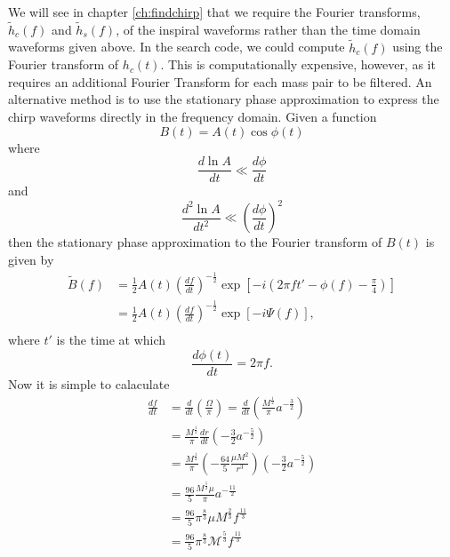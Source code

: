 We will see in chapter \ref{ch:findchirp} that we require the Fourier
transforms, $\tilde{h}_c(f)$ and $\tilde{h}_s(f)$, of the inspiral waveforms
rather than the time domain waveforms given above. In the search code, we
could compute $\tilde{h}_c(f)$ using the Fourier transform of $h_c(t)$.
This is computationally expensive, however, as it requires an additional
Fourier Transform for each mass pair to be filtered. An alternative 
method is to use the stationary phase approximation\cite{Mathews:1992} to
express the chirp waveforms directly in the frequency
domain\cite{WillWiseman:1996,Cutler:1994}. Given a function
\begin{equation}
B(t) = A(t) \cos \phi(t)
\end{equation}
where
\begin{equation}
\frac{d\ln A}{dt} \ll \frac{d\phi}{dt}
\end{equation}
and
\begin{equation}
\frac{d^2\ln A}{dt^2} \ll \left(\frac{d\phi}{dt}\right)^2
\end{equation}
then the stationary phase approximation to the Fourier transform of $B(t)$ is
given by
\begin{equation}
\begin{split}
\tilde{B}(f) &= \frac{1}{2} A(t) \left(\frac{df}{dt}\right)^{-\frac{1}{2}}
\exp\left[ -i \left(2\pi f t' - \phi(f) - \frac{\pi}{4} \right)\right] \\
&= \frac{1}{2} A(t) \left(\frac{df}{dt}\right)^{-\frac{1}{2}}
\exp\left[ -i \Psi(f) \right], \\
\end{split}
\label{eq:spexpression}
\end{equation}
where $t'$ is the time at which
\begin{equation}
\frac{d\phi(t)}{dt} = 2\pi f.
\end{equation}
Now it is simple to calaculate
\begin{align}
\label{eq:spdfdt}
\frac{df}{dt} 
     &= \frac{d}{dt} \left(\frac{\Omega}{\pi}\right) 
      = \frac{d}{dt} \left(\frac{M^\frac{1}{2}}{\pi} a^{-\frac{3}{2}}\right) \\
     &= \frac{M^\frac{1}{2}}{\pi} \frac{dr}{dt} \left(-\frac{3}{2} a^{-\frac{5}{2}}\right) \\
     &= \frac{M^\frac{1}{2}}{\pi} \left(-\frac{64}{5} \frac{\mu M^2}{r^3}\right)
        \left(-\frac{3}{2} a^{-\frac{5}{2}}\right) \\
     &= \frac{96}{5} \frac{M^\frac{5}{2} \mu}{\pi} a^{-\frac{11}{2}} \\
&= \frac{96}{5} \pi^\frac{8}{3} \mu M^\frac{2}{3} f^\frac{11}{3} \\
&= \frac{96}{5} \pi^\frac{8}{3} \mathcal{M}^\frac{5}{3} f^\frac{11}{3}
\end{align}
